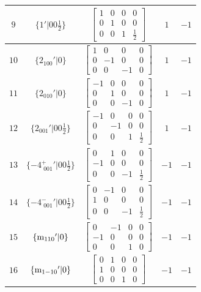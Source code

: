 \documentclass[fleqn,8pt]{jsarticle}
\begin{document}
\begin{longtable}{ccccc}
$ 9 $ & $ \{1{}'|0 0 \frac{1}{2}\} $ & $ \begin{bmatrix} 1 & 0 & 0 & 0 \\ 0 & 1 & 0 & 0 \\ 0 & 0 & 1 & \frac{1}{2} \end{bmatrix} $ & $ 1 $ & $ -1 $ \\ \hline
$ 10 $ & $ \{2{}_{100}{}'|0\} $ & $ \begin{bmatrix} 1 & 0 & 0 & 0 \\ 0 & -1 & 0 & 0 \\ 0 & 0 & -1 & 0 \end{bmatrix} $ & $ 1 $ & $ -1 $ \\ \hline
$ 11 $ & $ \{2{}_{010}{}'|0\} $ & $ \begin{bmatrix} -1 & 0 & 0 & 0 \\ 0 & 1 & 0 & 0 \\ 0 & 0 & -1 & 0 \end{bmatrix} $ & $ 1 $ & $ -1 $ \\ \hline
$ 12 $ & $ \{2{}_{001}{}'|0 0 \frac{1}{2}\} $ & $ \begin{bmatrix} -1 & 0 & 0 & 0 \\ 0 & -1 & 0 & 0 \\ 0 & 0 & 1 & \frac{1}{2} \end{bmatrix} $ & $ 1 $ & $ -1 $ \\ \hline
$ 13 $ & $ \{-4^{+}_{\,\,001}{}'|0 0 \frac{1}{2}\} $ & $ \begin{bmatrix} 0 & 1 & 0 & 0 \\ -1 & 0 & 0 & 0 \\ 0 & 0 & -1 & \frac{1}{2} \end{bmatrix} $ & $ -1 $ & $ -1 $ \\ \hline
$ 14 $ & $ \{-4^{-}_{\,\,001}{}'|0 0 \frac{1}{2}\} $ & $ \begin{bmatrix} 0 & -1 & 0 & 0 \\ 1 & 0 & 0 & 0 \\ 0 & 0 & -1 & \frac{1}{2} \end{bmatrix} $ & $ -1 $ & $ -1 $ \\ \hline
$ 15 $ & $ \{{\rm m}_{110}{}'|0\} $ & $ \begin{bmatrix} 0 & -1 & 0 & 0 \\ -1 & 0 & 0 & 0 \\ 0 & 0 & 1 & 0 \end{bmatrix} $ & $ -1 $ & $ -1 $ \\ \hline
$ 16 $ & $ \{{\rm m}_{1-10}{}'|0\} $ & $ \begin{bmatrix} 0 & 1 & 0 & 0 \\ 1 & 0 & 0 & 0 \\ 0 & 0 & 1 & 0 \end{bmatrix} $ & $ -1 $ & $ -1 $ \\
\end{longtable}
\end{document}
